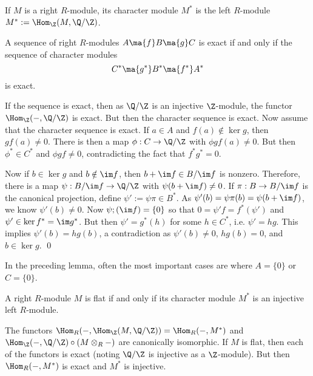 \begin{dfn}
If $M$ is a right $R$-module, its character module $M^*$ is the left $R$-module $M^*:= \Hom_\Z(M,\Q/\Z)$. 
\end{dfn}


\begin{lem}
A sequence of right $R$-modules $A \ma{f} B \ma{g} C$ is exact if and only if the sequence of character modules 
	\[
	C^* \ma{g^*} B^* \ma{f^*} A^*
	\]
is exact. 
\end{lem}

\pf If the sequence is exact, then as $\Q/\Z$ is an injective $\Z$-module, the functor $\Hom_\Z(-,\Q/\Z)$ is exact. But then the character sequence is exact. Now assume that the character sequence is exact. If $a \in A$ and $f(a) \notin \ker g$, then $gf(a) \neq 0$. There is then a map $\phi: C \to \Q/\Z$ with $\phi gf(a) \neq 0$. But then $\phi^* \in C^*$ and $\phi gf \neq 0$, contradicting the fact that $f^*g^*=0$. 

Now if $b \in \ker g$ and $b \notin \im f$, then $b+\im f \in B/\im f$ is nonzero. Therefore, there is a map $\psi: B/\im f \to \Q/\Z$ with $\psi(b+\im f) \neq 0$. If $\pi: B \to B/\im f$ is the canonical projection, define $\psi' := \psi \pi \in B^*$. As $\psi'(b)=\psi\pi(b)=\psi(b+\im f)$, we know $\psi'(b) \neq 0$. Now $\psi;(\im f)=\{0\}$ so that $0=\psi'f=f^*(\psi')$ and $\psi' \in \ker f^*=\im g^*$. But then $\psi'= g^*(h)$ for some $h \in C^*$, i.e. $\psi'=hg$. This implies $\psi'(b)=hg(b)$, a contradiction as $\psi'(b) \neq 0$, $hg(b)=0$, and $b \in \ker g$. \qed \\


\begin{rem}
In the preceding lemma, often the most important cases are where $A=\{0\}$ or $C=\{0\}$. 
\end{rem}


\begin{prop}[Lambek]
A right $R$-module $M$ is flat if and only if its character module $M^*$ is an injective left $R$-module.
\end{prop}

\pf The functors $\Hom_R(-,\Hom_\Z(M,\Q/\Z))=\Hom_R(-,M^*)$ and $\Hom_\Z(-,\Q/\Z) \circ (M \otimes_R -)$ are canonically isomorphic. If $M$ is flat, then each of the functors is exact (noting $\Q/\Z$ is injective as a $\Z$-module). But then $\Hom_R(-,M^*)$ is exact and $M^*$ is injective. 

